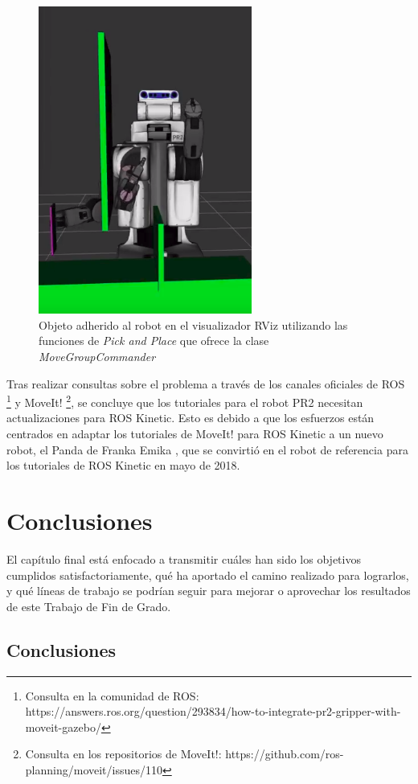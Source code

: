 \documentclass[12pt,spanish,chapterprefix, numbers=noenddot]{book}
\numberwithin{equation}{section}
\numberwithin{figure}{section}
\begin{document}
\begin{figure}[hbt!]
\centering
\includegraphics[width=7cm]{Figs/pick.png}
\par
\caption{\label{fig:pick}Objeto adherido al robot en el visualizador RViz utilizando las funciones de \textit{Pick and Place} que ofrece la clase \textit{MoveGroupCommander}}
\end{figure}

Tras realizar consultas sobre el problema a través de los canales oficiales de ROS \footnote{Consulta en la comunidad de ROS: https://answers.ros.org/question/293834/how-to-integrate-pr2-gripper-with-moveit-gazebo/} y MoveIt! \footnote{Consulta en los repositorios de MoveIt!: https://github.com/ros-planning/moveit/issues/110}, se concluye que los tutoriales para el robot PR2 necesitan actualizaciones para ROS Kinetic. Esto es debido a que los esfuerzos están centrados en adaptar los tutoriales de MoveIt! para ROS Kinetic a un nuevo robot, el Panda de Franka Emika \cite{emika}, que se convirtió en el robot de referencia para los tutoriales de ROS Kinetic en mayo de 2018. 

\chapter{Conclusiones}
El capítulo final está enfocado a transmitir cuáles han sido los objetivos cumplidos satisfactoriamente, qué ha aportado el camino realizado para lograrlos, y qué líneas de trabajo se podrían seguir para mejorar o aprovechar los resultados de este Trabajo de Fin de Grado.  
\section{Conclusiones}
\end{document}
